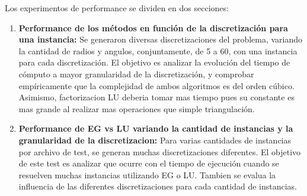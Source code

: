Los experimentos de performance se dividen en dos secciones:

\begin{enumerate}

\item \textbf {Performance de los m\'etodos en funci\'on de la discretizaci\'on para una instancia:}  Se generaron diversas discretizaciones del problema, variando la cantidad de radios y angulos, conjuntamente, de 5 a 60, con una instancia para cada discretizaci\'on. El objetivo es analizar la evoluci\'on del tiempo de c\'omputo a mayor granularidad de la discretizaci\'on, y comprobar emp\'iricamente que la complejidad de ambos algoritmos es del orden c\'ubico. Asimismo, factorizacion LU deberia tomar mas tiempo pues su constante es mas grande al realizar mas operaciones que simple triangulación.

\item \textbf{Performance de EG vs LU variando la cantidad de instancias y la granularidad de la discretizacion: } Para varias cantidades de instancias por archivo de test, se generan muchas discretizaciones diferentes. El objetivo de este test es analizar que ocurre con el tiempo de ejecución cuando se resuelven muchas instancias utilizando EG o LU. Tambien se evalua la influencia de las diferentes discretizaciones para cada cantidad de instancias.

\end{enumerate}

